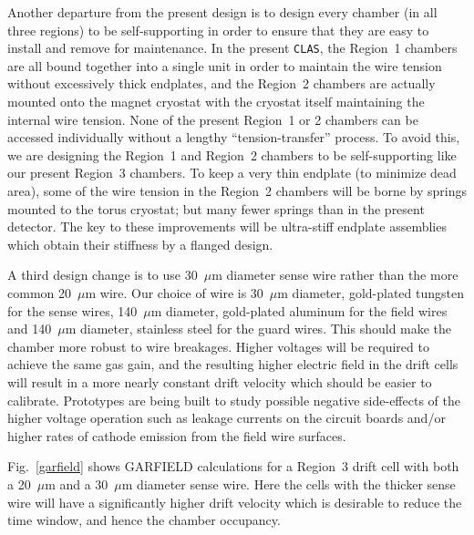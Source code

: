 Another departure from the present design is to design every chamber (in 
all three regions) to be self-supporting in order to ensure that they are 
easy to install and remove for maintenance.  In the present {\tt CLAS}, the 
Region~1 chambers are all bound together into a single unit in order to 
maintain the wire tension without excessively thick endplates, and the 
Region~2 chambers are actually mounted onto the magnet cryostat with the 
cryostat itself maintaining the internal wire tension.  None of the present 
Region~1 or 2 chambers can be accessed individually without a lengthy 
``tension-transfer'' process.  To avoid this, we are designing the
Region~1 and Region~2 chambers to be self-supporting like our present 
Region~3 chambers.  To keep a very thin endplate (to minimize dead area), 
some of the wire tension in the Region~2 chambers will be borne by springs 
mounted to the torus cryostat; but many fewer springs than in the present 
detector.  The key to these improvements will be ultra-stiff endplate 
assemblies which obtain their stiffness by a flanged design.  

A third design change is to use 30~$\mu$m diameter sense wire rather than 
the more common 20~$\mu$m wire. Our choice of wire is 30~$\mu$m diameter, 
gold-plated tungsten for the sense wires, 140~$\mu$m diameter, gold-plated 
aluminum for the field wires and 140~$\mu$m diameter, stainless steel for
the guard wires.   This should make the chamber more robust to wire 
breakages.  Higher voltages will be required to achieve the same gas gain, 
and the resulting higher electric field in the drift cells will result in 
a more nearly constant drift velocity which should be easier to calibrate.
Prototypes are being built to study possible negative side-effects of the 
higher voltage operation such as leakage currents on the circuit boards 
and/or higher rates of cathode emission from the field wire surfaces.

Fig.~\ref{garfield} shows GARFIELD calculations for a Region~3 drift cell
with both a 20~$\mu$m and a 30~$\mu$m diameter sense wire.  Here the
cells with the thicker sense wire will have a significantly higher drift 
velocity which is desirable to reduce the time window, and hence the chamber 
occupancy.

